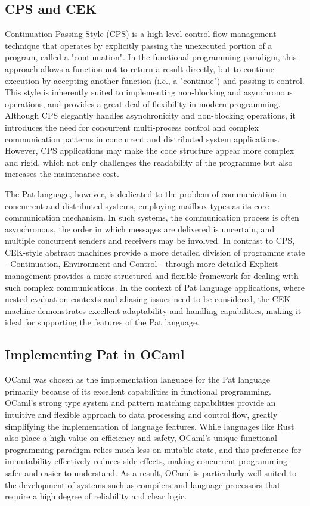 \documentclass{l4proj}
\begin{document}
\subsection{CPS and CEK}
Continuation Passing Style (CPS) is a high-level control flow management technique that operates by explicitly passing the unexecuted portion of a program, called a "continuation". In the functional programming paradigm, this approach allows a function not to return a result directly, but to continue execution by accepting another function (i.e., a "continue") and passing it control. This style is inherently suited to implementing non-blocking and asynchronous operations, and provides a great deal of flexibility in modern programming. Although CPS elegantly handles asynchronicity and non-blocking operations, it introduces the need for concurrent multi-process control and complex communication patterns in concurrent and distributed system applications. However, CPS applications may make the code structure appear more complex and rigid, which not only challenges the readability of the programme but also increases the maintenance cost.

The Pat language, however, is dedicated to the problem of communication in concurrent and distributed systems, employing mailbox types as its core communication mechanism. In such systems, the communication process is often asynchronous, the order in which messages are delivered is uncertain, and multiple concurrent senders and receivers may be involved. In contrast to CPS, CEK-style abstract machines provide a more detailed division of programme state - Continuation, Environment and Control - through more detailed Explicit management provides a more structured and flexible framework for dealing with such complex communications. In the context of Pat language applications, where nested evaluation contexts and aliasing issues need to be considered, the CEK machine demonstrates excellent adaptability and handling capabilities, making it ideal for supporting the features of the Pat language.

\subsection{Implementing Pat in OCaml}
OCaml was chosen as the implementation language for the Pat language primarily because of its excellent capabilities in functional programming. OCaml's strong type system and pattern matching capabilities provide an intuitive and flexible approach to data processing and control flow, greatly simplifying the implementation of language features. While languages like Rust also place a high value on efficiency and safety, OCaml's unique functional programming paradigm relies much less on mutable state, and this preference for immutability effectively reduces side effects, making concurrent programming safer and easier to understand. As a result, OCaml is particularly well suited to the development of systems such as compilers and language processors that require a high degree of reliability and clear logic.
\end{document}
